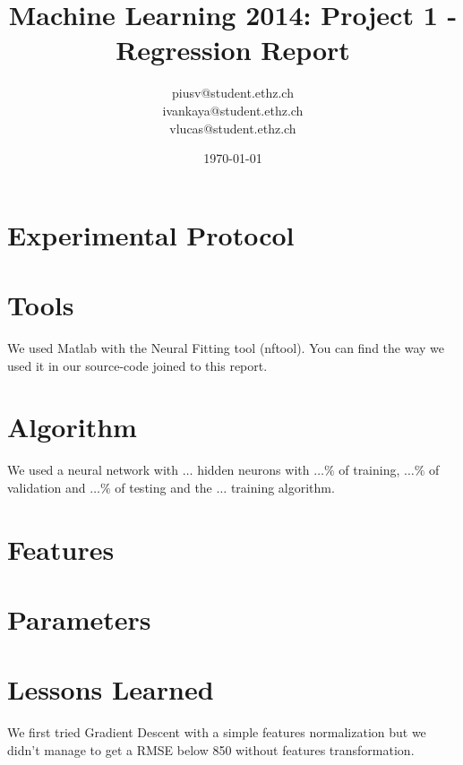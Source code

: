 \documentclass[a4paper, 11pt]{article}
\title{Machine Learning 2014: Project 1 - Regression Report}
\author{piusv@student.ethz.ch\\ ivankaya@student.ethz.ch\\ vlucas@student.ethz.ch\\}
\date{\today}
\begin{document}
\maketitle

\section*{Experimental Protocol}

\section{Tools}
We used Matlab with the Neural Fitting tool (nftool). You can find the way we used it in our source-code joined to this report.

\section{Algorithm}
We used a neural network with $\ldots$ hidden neurons with $\ldots\%$ of training, $\ldots\%$ of validation and $\ldots\%$ of testing and the $\ldots$ training algorithm.

\section{Features}

\section{Parameters}

\section{Lessons Learned}

We first tried Gradient Descent with a simple features normalization but we didn't manage to get a RMSE below 850 without features transformation.
\end{document}

